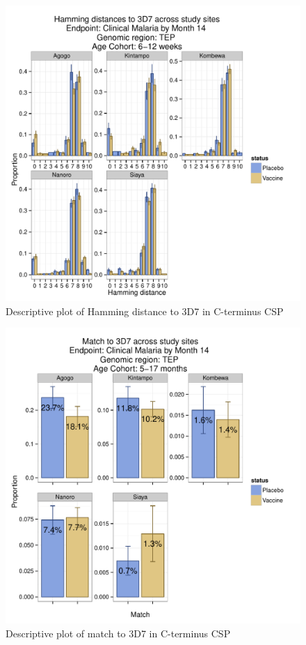 \documentclass[]{article}
\begin{document}
\begin{figure}[htbp]
\centering
\includegraphics{figures/hamming-newborn-sites-c-1.pdf}
\caption{Descriptive plot of Hamming distance to 3D7 in C-terminus CSP}
\end{figure}

\begin{figure}[htbp]
\centering
\includegraphics{figures/match-infant-sites-c-1.pdf}
\caption{Descriptive plot of match to 3D7 in C-terminus CSP}
\end{figure}
\end{document}
